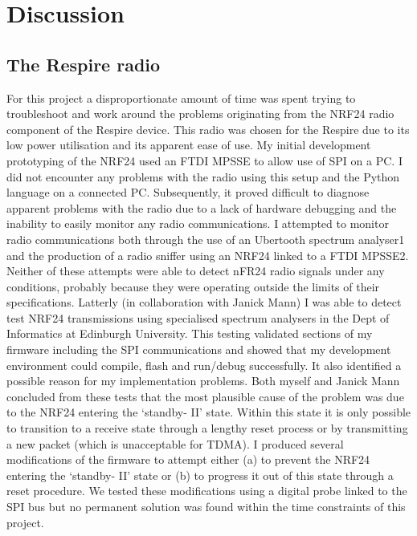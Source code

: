 
\chapter{Discussion}

\section{The Respire radio}
For this project a disproportionate amount of time was spent trying to troubleshoot and work
around the problems originating from the NRF24 radio component of the Respire device. This radio
was chosen for the Respire due to its low power utilisation and its apparent ease of use. My initial
development prototyping of the NRF24 used an FTDI MPSSE to allow use of SPI on a PC. I did not
encounter any problems with the radio using this setup and the Python language on a connected PC.
Subsequently, it proved difficult to diagnose apparent problems with the radio due to a lack of
hardware debugging and the inability to easily monitor any radio communications. I attempted to
monitor radio communications both through the use of an Ubertooth spectrum analyser1 and the
production of a radio sniffer using an NRF24 linked to a FTDI MPSSE2. Neither of these attempts
were able to detect nFR24 radio signals under any conditions, probably because they were operating
outside the limits of their specifications. Latterly (in collaboration with Janick Mann) I was able to
detect test NRF24 transmissions using specialised spectrum analysers in the Dept of Informatics at
Edinburgh University. This testing validated sections of my firmware including the SPI
communications and showed that my development environment could compile, flash and
run/debug successfully. It also identified a possible reason for my implementation problems. Both
myself and Janick Mann concluded from these tests that the most plausible cause of the problem
was due to the NRF24 entering the ‘standby- II’ state. Within this state it is only possible to
transition to a receive state through a lengthy reset process or by transmitting a new packet (which
is unacceptable for TDMA). I produced several modifications of the firmware to attempt either (a) to
prevent the NRF24 entering the ‘standby- II’ state or (b) to progress it out of this state through a
reset procedure. We tested these modifications using a digital probe linked to the SPI bus but no
permanent solution was found within the time constraints of this project.


